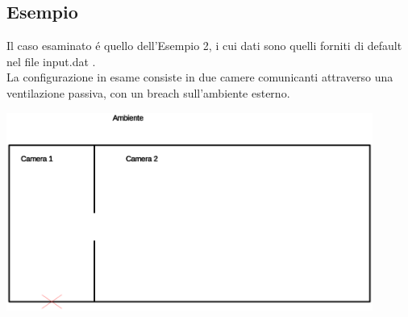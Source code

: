 \documentclass{article}
\begin{document}
        \subsection{Esempio}
        Il caso esaminato é quello dell'Esempio 2, i cui dati sono quelli
        forniti di default nel file input.dat .\\
        La configurazione in esame consiste in due camere comunicanti attraverso
        una ventilazione passiva, con un breach sull'ambiente esterno. 
        \begin{center}
            
        
            \includegraphics[width=0.9\textwidth]{ES1_Esempio2.eps}
        \end{center}
        \pagebreak
        \printbibliography
\end{document}
